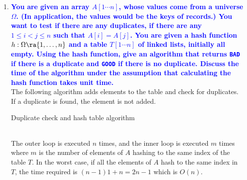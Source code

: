 \documentclass[11pt]{article}
\begin{document}
\begin{enumerate}
\item \textbf{\textcolor{blue}{You are given an array $A[1\cdots n]$, whose values come from a universe $\Omega$. (In application, the values would be the keys of records.) You want to test if there are any duplicates, if there are any $1\leq i < j \leq n$ such that $A[i]=A[j]$.  You are given a hash function $h:\Omega\ra \{1,\ldots,n\}$ and a table $T[1\cdots n]$ of linked lists, initially all empty. Using the hash function,  give an algorithm that returns {\tt BAD} if there is a duplicate and {\tt GOOD} if there is no duplicate. Discuss the time of the algorithm under the assumption that calculating the hash function takes unit time.}}
    \\ The following algorithm adds elements to the table and check for duplicates. If a duplicate is found, the element is not added.
    \\
    \begin{algorithm}[H]
        \caption{Duplicate check and hash table algorithm}
    \end{algorithm}
    \\ The outer loop is executed $n$ times, and the inner loop is executed $m$ times where
    $m$ is the number of elements of $A$ hashing to the same index of the table $T$. In the worst case, if all the elements of $A$ hash to the same index in $T$, the time required is $(n-1)1 + n = 2n - 1$ which is $O(n)$.


\end{enumerate}
\end{document}

